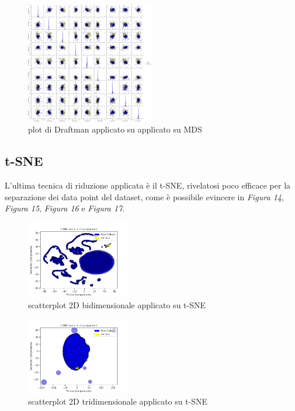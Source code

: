 \documentclass[11pt,a4paper,twocolumn]{article}
\begin{document}
	\begin{figure}[h]
		\centering
		\includegraphics[width=0.5\textwidth]{img/MDS_SPLOM.png}
		\caption{plot di Draftman applicato su applicato su MDS}
	\end{figure} 
\newpage
 \subsection{t-SNE}

    L'ultima tecnica di riduzione applicata è il t-SNE, rivelatosi poco efficace per la separazione dei data point del dataset, come è possibile evincere in \emph{Figura 14}, \emph{Figura 15}, \emph{Figura 16} e \emph{Figura 17}. \newpage
\begin{figure}[H]
		\centering
		\includegraphics[width=0.4\textwidth]{img/tSNE_2Dnc2.png}
		\caption{scatterplot 2D bidimensionale applicato su t-SNE}
	\end{figure}

	\begin{figure}[H]
		\centering
		\includegraphics[width=0.4\textwidth]{img/tSNE_2Dnc3.png}
		\caption{scatterplot 2D tridimensionale applicato su t-SNE}
	\end{figure}
\end{document}
